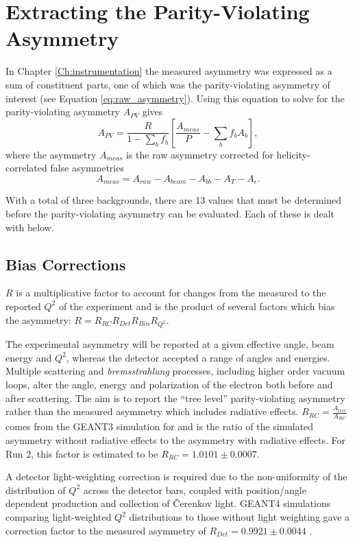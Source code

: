\section{\label{Sctn:qwpExtract}Extracting the Parity-Violating Asymmetry}
In Chapter \ref{Ch:instrumentation} the measured asymmetry was expressed as a sum of constituent parts, one of which was the parity-violating asymmetry of interest (see Equation \ref{eq:raw_asymmetry}). Using this equation to solve for the parity-violating asymmetry $A_{PV}$ gives
\begin{equation}
A_{PV}=\frac{R}{1-\sum_bf_b}\left[\frac{A_{meas}}{P}-\sum_bf_bA_b\right],
\label{eq:pv_asymmetry}
\end{equation} 
where the asymmetry $A_{meas}$ is the raw asymmetry corrected for helicity-correlated false asymmetries
\begin{equation}
A_{meas}=A_{raw}-A_{beam}-A_{bb}-A_T-A_{\epsilon}.
\label{eq:a_meas}
\end{equation} 

With a total of three backgrounds, there are 13 values that must be determined before the parity-violating asymmetry can be evaluated. Each of these is dealt with below.
\subsection{Bias Corrections}
$R$ is a multiplicative factor to account for changes from the measured to the reported $Q^2$ of the experiment and is the product of several factors which bias the asymmetry: $R=R_{RC}R_{Det}R_{Bin}R_{Q^2}$.

The experimental asymmetry will be reported at a given effective angle, beam energy and $Q^2$, whereas the detector accepted a range of angles and energies. Multiple scattering and {\it bremsstrahlung} processes, including higher order vacuum loops, alter the angle, energy and polarization of the electron both before and after scattering. The aim is to report the ``tree level'' parity-violating asymmetry rather than the measured asymmetry which includes radiative effects. $R_{RC}=\frac{A_{tree}}{A_{RC}}$ comes from the GEANT3 simulation for \Qs and is the ratio of the simulated asymmetry without radiative effects to the asymmetry with radiative effects. For Run 2, this factor is estimated to be $R_{RC}=1.0101\pm 0.0007$.

A detector light-weighting correction is required due to the non-uniformity of the distribution of $Q^2$ across the detector bars, coupled with position/angle dependent production and collection of \v{C}erenkov light. GEANT4 simulations comparing light-weighted $Q^2$ distributions to those without light weighting gave a correction factor to the measured asymmetry of $R_{Det}=0.9921\pm 0.0044$ . 

